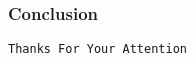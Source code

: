 
\begin{frame}
\frametitle{Conclusion}
%
\begin{center}
\colorbox{green!10}{
{\texttt{\color{m1}Thanks For Your Attention}}
}
\end{center}
%
\end{frame}


